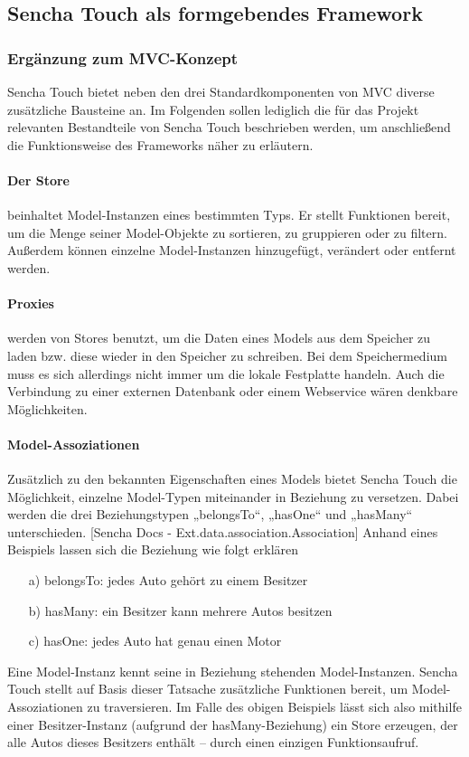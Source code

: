 \subsection{Sencha Touch als formgebendes Framework}
\subsubsection*{Ergänzung zum MVC-Konzept}
Sencha Touch bietet neben den drei Standardkomponenten von MVC diverse zusätzliche Bausteine an. Im Folgenden sollen lediglich die für das Projekt relevanten Bestandteile von Sencha Touch beschrieben werden, um anschließend die Funktionsweise des Frameworks näher zu erläutern.

\paragraph{Der Store} beinhaltet Model-Instanzen eines bestimmten Typs. Er stellt Funktionen bereit, um die Menge seiner Model-Objekte zu sortieren, zu gruppieren oder zu filtern. Außerdem können einzelne Model-Instanzen hinzugefügt, verändert oder entfernt werden.

\paragraph{Proxies }werden von Stores benutzt, um die Daten eines Models aus dem Speicher zu laden bzw. diese wieder in den Speicher zu schreiben. Bei dem Speichermedium muss es sich allerdings nicht immer um die lokale Festplatte handeln. Auch die Verbindung zu einer externen Datenbank oder einem Webservice wären denkbare Möglichkeiten.

\paragraph{Model-Assoziationen}
Zusätzlich zu den bekannten Eigenschaften eines Models bietet Sencha Touch die Möglichkeit, einzelne Model-Typen miteinander in Beziehung zu versetzen. Dabei werden die drei Beziehungstypen „belongsTo“, „hasOne“ und „hasMany“ unterschieden. [Sencha Docs - Ext.data.association.Association] Anhand eines Beispiels lassen sich die Beziehung wie folgt erklären
\begin{itemize}
	\item[a)] belongsTo: jedes Auto gehört zu einem Besitzer
	\item[b)] hasMany: ein Besitzer kann mehrere Autos besitzen
	\item[c)] hasOne: jedes Auto hat genau einen Motor
\end{itemize}
Eine Model-Instanz kennt seine in Beziehung stehenden Model-Instanzen. Sencha Touch stellt auf Basis dieser Tatsache zusätzliche Funktionen bereit, um Model-Assoziationen zu traversieren. Im Falle des obigen Beispiels lässt sich also mithilfe einer Besitzer-Instanz (aufgrund der hasMany-Beziehung) ein Store erzeugen, der alle Autos dieses Besitzers enthält – durch einen einzigen Funktionsaufruf.


